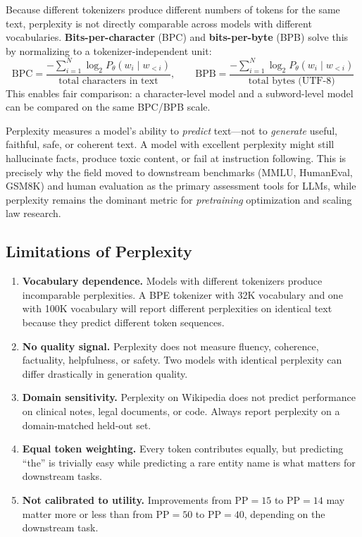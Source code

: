 Because different tokenizers produce different numbers of tokens for the same
text, perplexity is not directly comparable across models with different
vocabularies.  \textbf{Bits-per-character} (BPC) and \textbf{bits-per-byte}
(BPB) solve this by normalizing to a tokenizer-independent unit:
\[
    \text{BPC} = \frac{-\sum_{i=1}^{N}\log_2 P_\theta(w_i \mid w_{<i})}{\text{total characters in text}}, \qquad
    \text{BPB} = \frac{-\sum_{i=1}^{N}\log_2 P_\theta(w_i \mid w_{<i})}{\text{total bytes (UTF-8)}}
\]
This enables fair comparison: a character-level model and a subword-level model
can be compared on the same BPC/BPB scale.

\begin{keyinsight}
Perplexity measures a model's ability to \emph{predict} text---not to
\emph{generate} useful, faithful, safe, or coherent text.  A model with
excellent perplexity might still hallucinate facts, produce toxic content, or
fail at instruction following.  This is precisely why the field moved to
downstream benchmarks (MMLU, HumanEval, GSM8K) and human evaluation as the
primary assessment tools for LLMs, while perplexity remains the dominant metric
for \emph{pretraining} optimization and scaling law research.
\end{keyinsight}

\subsection{Limitations of Perplexity}

\begin{enumerate}[label=\textbf{\arabic*.}]
    \item \textbf{Vocabulary dependence.}  Models with different tokenizers
          produce incomparable perplexities.  A BPE tokenizer with 32K vocabulary
          and one with 100K vocabulary will report different perplexities on
          identical text because they predict different token sequences.

    \item \textbf{No quality signal.}  Perplexity does not measure fluency,
          coherence, factuality, helpfulness, or safety.  Two models with
          identical perplexity can differ drastically in generation quality.

    \item \textbf{Domain sensitivity.}  Perplexity on Wikipedia does not predict
          performance on clinical notes, legal documents, or code.  Always report
          perplexity on a domain-matched held-out set.

    \item \textbf{Equal token weighting.}  Every token contributes equally, but
          predicting ``the'' is trivially easy while predicting a rare entity
          name is what matters for downstream tasks.

    \item \textbf{Not calibrated to utility.}  Improvements from $\text{PP}=15$ to
          $\text{PP}=14$ may matter more or less than from $\text{PP}=50$ to
          $\text{PP}=40$, depending on the downstream task.
\end{enumerate}

